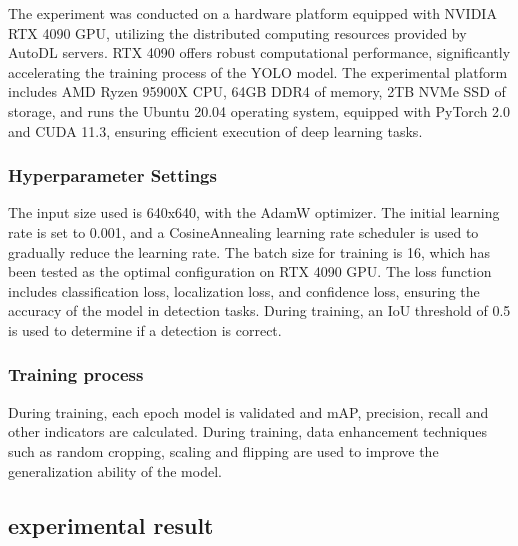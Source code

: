 \documentclass[
]{article}
\begin{document}
The experiment was conducted on a hardware platform equipped with NVIDIA
RTX 4090 GPU, utilizing the distributed computing resources provided by
AutoDL servers. RTX 4090 offers robust computational performance,
significantly accelerating the training process of the YOLO model. The
experimental platform includes AMD Ryzen 95900X CPU, 64GB DDR4 of
memory, 2TB NVMe SSD of storage, and runs the Ubuntu 20.04 operating
system, equipped with PyTorch 2.0 and CUDA 11.3, ensuring efficient
execution of deep learning tasks.

\subsubsection{Hyperparameter Settings}\label{hyperparameter-settings}

The input size used is 640x640, with the AdamW optimizer. The initial
learning rate is set to 0.001, and a CosineAnnealing learning rate
scheduler is used to gradually reduce the learning rate. The batch size
for training is 16, which has been tested as the optimal configuration
on RTX 4090 GPU. The loss function includes classification loss,
localization loss, and confidence loss, ensuring the accuracy of the
model in detection tasks. During training, an IoU threshold of 0.5 is
used to determine if a detection is correct.

\subsubsection{Training process}\label{training-process}

During training, each epoch model is validated and mAP, precision,
recall and other indicators are calculated. During training, data
enhancement techniques such as random cropping, scaling and flipping are
used to improve the generalization ability of the model.

\subsection{experimental result}\label{experimental-result}
\end{document}
